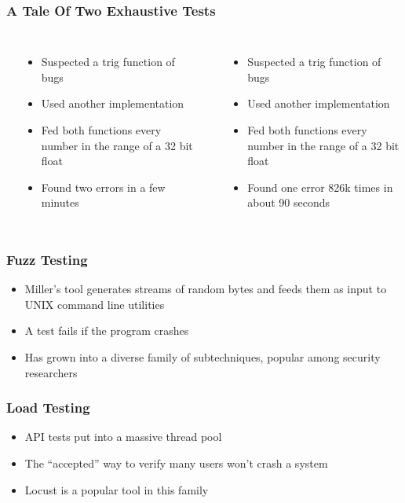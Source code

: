 \begin{frame}
\frametitle{A Tale Of Two Exhaustive Tests}
\begin{columns}[c]
    \textbf{\citet{hoffman2003Exhausting}}
    \begin{itemize}
      \item Suspected a trig function of bugs
      \item Used another implementation
      \item Fed both functions every number in the range of a 32 bit float
      \item Found two errors in a few minutes
    \end{itemize}
    \textbf{\citet{dawsonFourBillion}}
    \begin{itemize}
      \item Suspected a trig function of bugs
      \item Used another implementation
      \item Fed both functions every number in the range of a 32 bit float
      \item Found one error 826k times in about 90 seconds
    \end{itemize}
\end{columns}
\end{frame}

\begin{frame}
  \frametitle{Fuzz Testing}
  \begin{itemize}
    \item Miller's tool generates streams of random bytes and feeds them as input to UNIX command line utilities \citep{miller1990empirical}
    \item A test fails if the program crashes
    \item Has grown into a diverse family of subtechniques, popular among security researchers
  \end{itemize}
\end{frame}

\begin{frame}
  \frametitle{Load Testing}
  \begin{itemize}
    \item API tests put into a massive thread pool
    \item The ``accepted'' way to verify many users won't crash a system
    \item Locust is a popular tool in this family \citep{heymanlocust}
  \end{itemize}
\end{frame}


